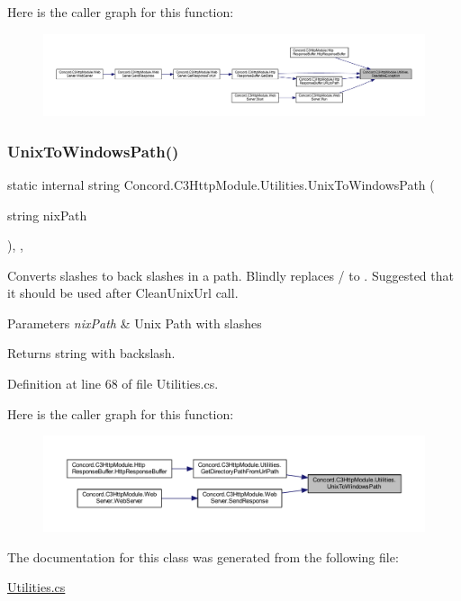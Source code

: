 Here is the caller graph for this function\+:
\nopagebreak
\begin{figure}[H]
\begin{center}
\leavevmode
\includegraphics[width=350pt]{class_concord_1_1_c3_http_module_1_1_utilities_aadfb9271c63b98ed7754cfb8e07072e2_icgraph}
\end{center}
\end{figure}
\mbox{\label{class_concord_1_1_c3_http_module_1_1_utilities_a40b3b3a642c04aacdbcf766ea049313d}} 
\subsubsection{\texorpdfstring{UnixToWindowsPath()}{UnixToWindowsPath()}}
{\footnotesize\ttfamily static internal string Concord.\+C3\+Http\+Module.\+Utilities.\+Unix\+To\+Windows\+Path (\begin{DoxyParamCaption}\item[{string}]{nix\+Path }\end{DoxyParamCaption})\hspace{0.3cm}{\ttfamily [inline]}, {\ttfamily [static]}, {\ttfamily [private]}}



Converts slashes to back slashes in a path. Blindly replaces / to . Suggested that it should be used after Clean\+Unix\+Url call. 


\begin{DoxyParams}{Parameters}
{\em nix\+Path} & Unix Path with slashes\\
\hline
\end{DoxyParams}
\begin{DoxyReturn}{Returns}
string with backslash.
\end{DoxyReturn}


Definition at line 68 of file Utilities.\+cs.

Here is the caller graph for this function\+:
\nopagebreak
\begin{figure}[H]
\begin{center}
\leavevmode
\includegraphics[width=350pt]{class_concord_1_1_c3_http_module_1_1_utilities_a40b3b3a642c04aacdbcf766ea049313d_icgraph}
\end{center}
\end{figure}


The documentation for this class was generated from the following file\+:\begin{DoxyCompactItemize}
\item 
\mbox{\hyperlink{_utilities_8cs}{Utilities.\+cs}}\end{DoxyCompactItemize}
